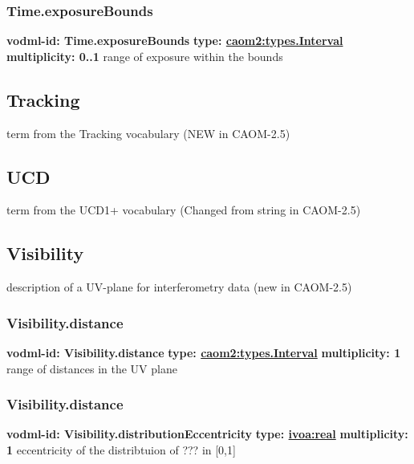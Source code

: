     \subsubsection{Time.exposureBounds}
      \textbf{vodml-id: Time.exposureBounds} \newline
      \textbf{type: \hyperref[sect:types.Interval]{caom2:types.Interval}} \newline
      \textbf{multiplicity: 0..1} \newline
      range of exposure within the bounds

  \subsection{Tracking}
  \label{sect:Tracking}
    term from the Tracking vocabulary (NEW in CAOM-2.5)

  \subsection{UCD}
  \label{sect:UCD}
    term from the UCD1+ vocabulary (Changed from string in CAOM-2.5)

  \subsection{Visibility}
  \label{sect:Visibility}
    description of a UV-plane for interferometry data (new in CAOM-2.5)

    \subsubsection{Visibility.distance}
      \textbf{vodml-id: Visibility.distance} \newline
      \textbf{type: \hyperref[sect:types.Interval]{caom2:types.Interval}} \newline
      \textbf{multiplicity: 1} \newline
      range of distances in the UV plane

    \subsubsection{Visibility.distance}
      \textbf{vodml-id: Visibility.distributionEccentricity} \newline
      \textbf{type: \hyperref[sect:ivoa]{ivoa:real}} \newline
      \textbf{multiplicity: 1} \newline
      eccentricity of the distribtuion of ??? in [0,1]

